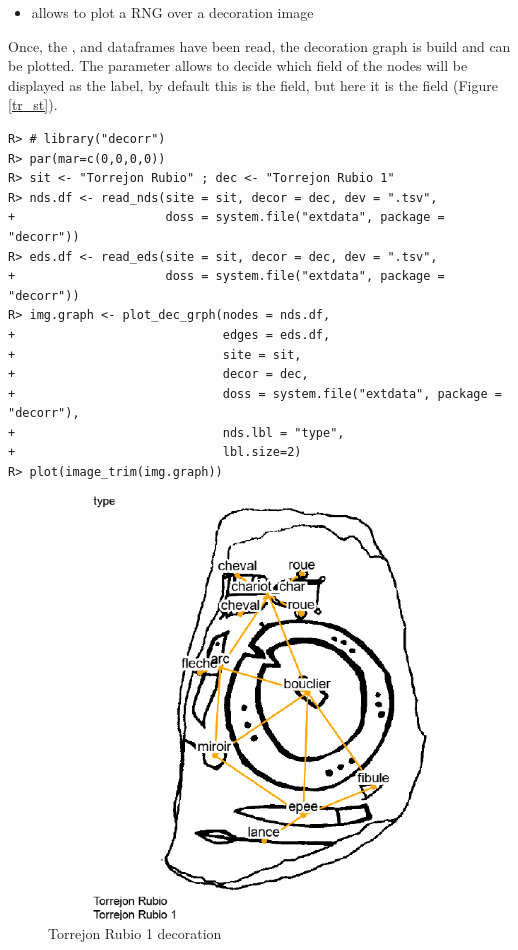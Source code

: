 \documentclass[article]{jss}\usepackage{knitr}
\begin{document}

\begin{itemize}
\setlength\itemsep{.1em}
\item {} allows to plot a RNG over a decoration image
\end{itemize}

Once, the ,  and  dataframes have been read, the decoration graph is build and can be plotted. The  parameter allows to decide which field of the nodes will be displayed as the label, by default this is the  field, but here it is the  field (Figure \ref{tr_st}).

\begin{kframe}
\begin{verbatim}
R> # library("decorr")
R> par(mar=c(0,0,0,0))
R> sit <- "Torrejon Rubio" ; dec <- "Torrejon Rubio 1"
R> nds.df <- read_nds(site = sit, decor = dec, dev = ".tsv",
+                     doss = system.file("extdata", package = "decorr"))
R> eds.df <- read_eds(site = sit, decor = dec, dev = ".tsv",
+                     doss = system.file("extdata", package = "decorr"))
R> img.graph <- plot_dec_grph(nodes = nds.df,
+                             edges = eds.df,
+                             site = sit,
+                             decor = dec,
+                             doss = system.file("extdata", package = "decorr"),
+                             nds.lbl = "type",
+                             lbl.size=2)
R> plot(image_trim(img.graph))
\end{verbatim}
\end{kframe}\begin{figure}[H]

{\centering \includegraphics[width=\maxwidth]{figure/tr_st-1} 

}

\caption{\label{fig:figs}Torrejon Rubio 1 decoration}\label{fig:tr_st}
\end{figure}
\end{document}
